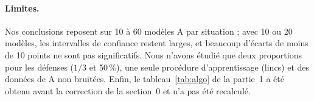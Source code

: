 \documentclass[11pt,a4paper]{article}
\begin{document}
\paragraph{Limites.} Nos conclusions reposent sur 10 à 60 modèles A par situation ; avec 10 ou 20 modèles, les
intervalles de confiance restent larges, et beaucoup d'écarts de moins de 10 points ne sont pas significatifs. Nous
n'avons étudié que deux proportions pour les défenses ($1/3$ et 50\,\%), une seule procédure d'apprentissage (lincs)
et des données de A non bruitées. Enfin, le tableau~\ref{tab:algo} de la partie~1 a été obtenu avant la
correction de la section~0 et n'a pas été recalculé.
\end{document}
